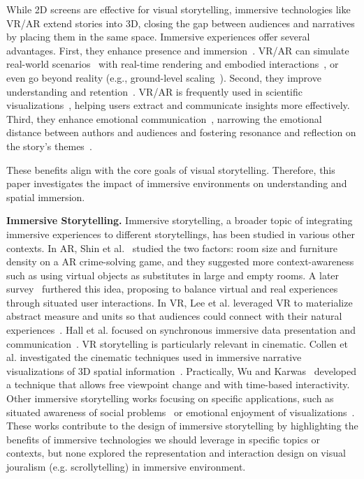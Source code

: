 While 2D screens are effective for visual storytelling, immersive technologies like VR/AR extend stories into 3D, closing the gap between audiences and narratives by placing them in the same space. Immersive experiences offer several advantages.
First, they enhance presence and immersion~\cite{servotte2020vr}. VR/AR can simulate real-world scenarios~\cite{zhao2023leanon} with real-time rendering and embodied interactions~\cite{huang2023embodied,zhu2024compositingvis,in2023table}, or even go beyond reality (e.g., ground-level scaling~\cite{abtahi2019m}).
Second, they improve understanding and retention~\cite{Motejlek2023The, Yildirim2019The}. VR/AR is frequently used in scientific visualizations~\cite{marriott2018immersive}, helping users extract and communicate insights more effectively.
Third, they enhance emotional communication~\cite{kandaurova2019effects}, narrowing the emotional distance between authors and audiences and fostering resonance and reflection on the story's themes~\cite{bahng2020reflexive}.

These benefits align with the core goals of visual storytelling. Therefore, this paper investigates the impact of immersive environments on understanding and spatial immersion.

\noindent\textbf{Immersive Storytelling.}
Immersive storytelling, a broader topic of integrating immersive experiences to different storytellings, has been studied in various other contexts. {In AR, Shin et al.~\cite{shin2019any} studied the two factors: room size and furniture density on a AR crime-solving game, and they suggested more context-awareness such as using virtual objects as substitutes in large and empty rooms. A later survey~\cite{shin2024investigating} furthered this idea, proposing to balance virtual and real experiences through situated user interactions. In VR,} Lee et al. leveraged VR to materialize abstract measure and units so that audiences could connect with their natural experiences~\cite{lee2020data}. Hall et al. focused on synchronous immersive data presentation and communication~\cite{hall2022augmented}. {VR storytelling is particularly relevant in cinematic.} Collen et al. investigated the cinematic techniques used in immersive narrative visualizations of 3D spatial information~\cite{conlen2023cinematic}. {Practically, Wu and Karwas~\cite{wu2024metamorphosis} developed a technique that allows free viewpoint change and with time-based interactivity.} Other immersive storytelling works focusing on specific applications, such as situated awareness of social problems~\cite{assor2024augmented, zhu2024reader} or emotional enjoyment of visualizations~\cite{romat2020dear}. These works contribute to the design of immersive storytelling by highlighting the benefits of immersive technologies we should leverage in specific topics or contexts, but none explored the representation and interaction design on visual jouralism (e.g. scrollytelling) in immersive environment. 

